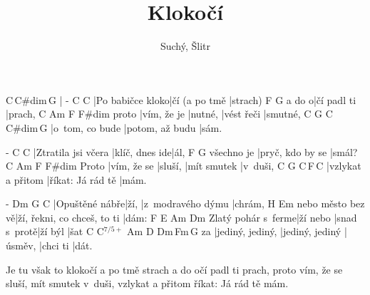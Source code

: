 \documentclass{song}
\title{Klokočí}
\author{Suchý, Šlitr}
\begin{document}
\strophe
C\,C\#dim\,G\7
|
-                C              C\7
|Po babičce kloko|čí (a po tmě |strach)
      F           G\7
a do o|čí padl ti |prach,
      C           Am      F          F\#dim
proto |vím, že je |nutné, |vést řeči |smutné,
C               G\7             C\,C\#dim\,G\7
|o~tom, co bude |potom, až budu |sám.
\endstrophe

\strophe
-                   C              C\7
|Ztratila jsi včera |klíč, dnes ide|ál,
           F                G\7
všechno je |pryč, kdo by se |smál?
      C           Am      F           F\#dim
Proto |vím, že se |sluší, |mít smutek |v~duši,
C                 G\7               C\,F\,C
|vzlykat a přitom |říkat: Já rád tě |mám.
\endstrophe

\strophe
-              Dm   G\7               C
|Opuštěné nábře|ží, |z~modravého dýmu |chrám,
                 H\7                         Em
nebo město bez vě|ží, řekni, co chceš, to ti |dám:
                   F        E\7          Am      Dm\7
Zlatý pohár s~ferme|ží nebo |snad s~protě|ží býl |šat
   C                C$^{7/5+}$      Am      D\7      Dm\7\,Fm\,G\7
za |jediný, jediný, |jediný, jediný |úsměv, |chci ti |dát.
\endstrophe

\strophe*
Je tu však to klokočí a po tmě strach
a do očí padl ti prach,
proto vím, že se sluší, mít smutek v~duši,
vzlykat a přitom říkat: Já rád tě mám.
\endstrophe

\end{document}
